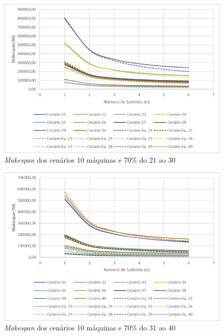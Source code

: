 \begin{figure}[H]
    \centering
     \includegraphics[width=13cm]{Apendices/Figuras/10m70_21-30.png}
     \caption{\textit{Makespan} dos cenários 10 máquinas e 70\% do 21 ao 30}
    \label{fig:10m70_21-30}
\end{figure}

\begin{figure}[H]
    \centering
     \includegraphics[width=13cm]{Apendices/Figuras/10m70_31-40.png}
     \caption{\textit{Makespan} dos cenários 10 máquinas e 70\% do 31 ao 40}
    \label{fig:10m70_31-40}
\end{figure}

